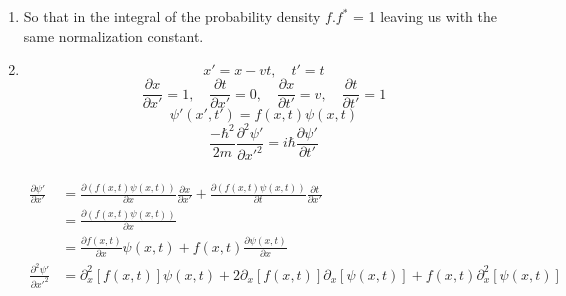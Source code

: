 \documentclass[12pt]{article}
\begin{document}
\begin{enumerate}
    \item
          So that in the integral of the probability density $f.f^*$ = 1 leaving us with the same normalization constant.
    \item
          \[
              x' = x - vt, \quad t' = t
          \]
          \[
              \frac{\partial x}{\partial x'} = 1, \quad
              \frac{\partial t}{\partial x'} = 0, \quad
              \frac{\partial x}{\partial t'} = v, \quad
              \frac{\partial t}{\partial t'} = 1
          \]
          \[
              \psi'(x',t') = f(x,t)\psi(x,t)
          \]
          \[
              \frac{-\hbar^2}{2m}
              \frac{\partial^2 \psi'}{\partial x'^2} = i\hbar \frac{\partial \psi'}{\partial t'}
          \]
          \\
          \begin{equation*}
              \begin{split}
                  \frac{\partial \psi'}{\partial x'} & =
                  \frac{\partial (f(x,t)\psi(x,t))}{\partial x}\frac{\partial x}{\partial x'} +
                  \frac{\partial (f(x,t)\psi(x,t))}{\partial t}\frac{\partial t}{\partial x'}                                                                       \\
                                                     & = \frac{\partial (f(x,t)\psi(x,t))}{\partial x}                                                              \\
                                                     & = \frac{\partial f(x,t)}{\partial x}\psi(x,t) + f(x,t)\frac{\partial \psi(x,t)}{\partial x}                  \\
                  \frac{\partial^2 \psi'}{\partial x'^2}
                                                     & = \partial^2_x [f(x,t)]\psi(x,t) + 2\partial_x [f(x,t)]\partial_x[\psi(x,t)] + f(x,t)\partial^2_x[\psi(x,t)] \\
              \end{split}
          \end{equation*}


\end{enumerate}
\end{document}
